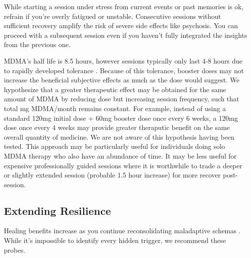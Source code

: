 \documentclass[12pt,letterpaper]{article}
\begin{document}
While starting a session under stress from current events or past memories is ok, refrain if you're overly fatigued or unstable.   Consecutive sessions without sufficient recovery amplify the risk of severe side effects like psychosis. You can proceed with a subsequent session even if you haven't fully integrated the insights from the previous one. 

MDMA's half life is 8.5 hours, however sessions typically only last 4-8 hours due to rapidly developed tolerance \cite{torrePharmacology,mithoeferManual,vizeliActuteEffects,farreTolerance}. Because of this tolerance, booster doses may not increase the beneficial subjective effects as much as the dose would suggest. We hypothesize that a greater therapeutic effect may be obtained for the same amount of MDMA by reducing dose but increasing session frequency, such that total mg MDMA/month remains constant. For example, instead of using a standard 120mg initial dose + 60mg booster dose once every 6 weeks, a 120mg dose once every 4 weeks may provide greater theraputic benefit on the same overall quantity of medicine. We are not aware of this hypothesis having been tested. This approach may be particularly useful for individuals doing solo MDMA therapy who also have an abundance of time. It may be less useful for expensive professionally guided sessions where it is worthwhile to trade a deeper or slightly extended session (probable 1.5 hour increase) for more recover post-session.
\subsection{Extending Resilience}
\label{completed}
Healing benefits increase as you continue reconsolidating maladaptive schemas \cite{rachmanProcessing}. While it's impossible to identify every hidden trigger, we recommend these probes.
\end{document}
